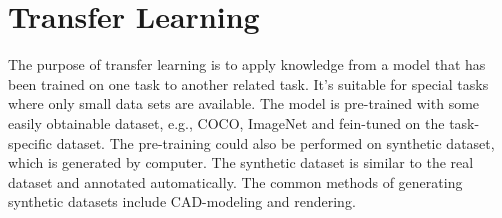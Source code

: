 \section{Transfer Learning}
  The purpose of transfer learning is to apply knowledge from a model that has been trained on one task to another related task. It's suitable for special tasks where only 
  small data sets are available. The model is pre-trained with some easily obtainable dataset\cite{weiss-2016-transferLearning}, e.g., COCO\cite{lin-2014-microsoftCOCO},
  ImageNet\cite{ILSVRC15} and fein-tuned on the task-specific dataset. The pre-training could also be performed on synthetic dataset, which is generated by computer.
  The synthetic dataset is similar to the real dataset and annotated automatically. The common methods of generating synthetic datasets include CAD-modeling and rendering.
  
  